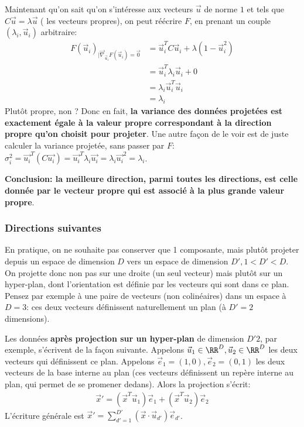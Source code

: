 \documentclass[french,twoside]{article}
\newcommand{\cad}{\text{c'est-à-dire} }
\begin{document}
Maintenant qu'on sait qu'on s'intéresse aux vecteurs $\vec u$ de norme $1$ et tels que $C \vec u = \lambda \vec u$ (\cad les vecteurs propres), on peut réécrire $F$, en prenant un couple $(\lambda_i,\vec u_i)$ arbitraire:
\begin{align}
F(\vec u_i)_{| \vec \nabla_{\vec u_i} F(\vec u_i) =\vec 0 }
&= \vec u_i^T C \vec u _i + \lambda (1-\vec u_i^2) 
\\&= \vec u_i^T \lambda_i \vec u_i  + 0 
\\&= \lambda_i  \vec u_i^T \vec u_i
\\&= \lambda_i 
\end{align}
Plutôt propre, non ? Donc en fait, \textbf{la variance des données projetées est exactement égale à la valeur propre correspondant à la direction propre qu'on choisit pour projeter}.
Une autre façon de le voir est de juste calculer la variance projetée, sans passer par $F$:
$ \sigma_i ^2 = \vec{u_i}^T (C \vec{u_i}) = \vec{u_i}^T \lambda_i \vec{u_i} = \lambda_i \vec{u_i}^2 = \lambda_i $.

\textbf{Conclusion: la meilleure direction, parmi toutes les directions, est celle donnée par le vecteur propre qui est associé à la plus grande valeur propre}.

\subsubsection{Directions suivantes}

En pratique, on ne souhaite pas conserver que 1 composante, mais plutôt projeter depuis un espace de dimension $D$ vers un espace de dimension $D', 1<D'<D$. 
On projette donc non pas sur une droite (un seul vecteur) mais plutôt sur un hyper-plan, dont l'orientation est définie par les vecteurs qui sont dans ce plan. Pensez par exemple à une paire de vecteurs (non colinéaires) dans un espace à $D=3$: ces deux vecteurs définissent naturellement un plan (à $D'=2$ dimensions).

Les données \textbf{après projection sur un hyper-plan} de dimension $D'2$, par exemple, s'écrivent de la façon suivante.
Appelons $\vec u_1 \in \RR^D, \vec u_2\in \RR^D$ les deux vecteurs qui définissent ce plan.
Appelons $\vec e_1 = (1,0), \vec e_2= (0,1)$ les deux vecteurs de la base interne au plan (ces vecteurs définissent un repère interne au plan, qui permet de se promener dedans).
Alors la projection s'écrit:
\begin{align}
\vec x' = (\vec x ^T \vec u_1) \vec e_1 + (\vec x ^T  \vec u_2) \vec e_2 
\end{align}
L'écriture générale est $\vec x' = \sum_{d'=1}^{D'} (\vec x \cdot \vec u_{d'}) \vec e_{d'} $.
\end{document}

